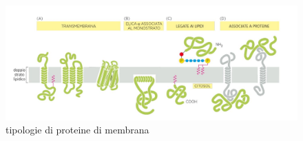          \begin{figure}[h]
            \centering
            \includegraphics[width=1\textwidth]{images/proteinemembrana.JPG}
            \caption{\small tipologie di proteine di membrana}
            \label{fig:mesh1}
        \end{figure}
        
